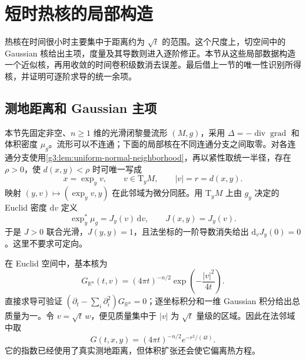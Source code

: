 
% 
% 

\section{短时热核的局部构造}
\label{g3:sec:1602}

热核在时间很小时主要集中于距离约为 \(\sqrt t\) 的范围。这个尺度上，切空间中的 Gaussian 核给出主项，度量及其导数则进入逐阶修正。本节从这些局部数据构造一个近似核，再用收敛的时间卷积级数消去误差。最后借上一节的唯一性识别所得核，并证明可逐阶求导的统一余项。

\subsection{测地距离和 Gaussian 主项}
\label{g3:subsec:1602:01}
本节先固定非空、\(n\ge1\) 维的光滑闭黎曼流形 \((M,g)\)，采用 \(\Delta=-\operatorname{div}\operatorname{grad}\) 和体积密度 \(\mu_g\)。流形可以不连通；下面的局部核在不同连通分支之间取零。对各连通分支使用\cref{g3:lem:uniform-normal-neighborhood}，再以紧性取统一半径，存在 \(\rho>0\)，使 \(d(x,y)<\rho\) 时可唯一写成
\[
	x=\exp_yv,\qquad v\in\mathrm T_yM,\qquad |v|=r=d(x,y).
\]
映射 \((y,v)\mapsto(\exp_yv,y)\) 在此邻域为微分同胚。用 \(\mathrm T_yM\) 上由 \(g_y\) 决定的 Euclid 密度 \(\mathrm dv\) 定义
\begin{equation}\label{g3:eq:heat-normal-density}
	\exp_y^*\mu_g=J_y(v)\,\mathrm dv,
	\qquad J(x,y)=J_y(v).
\end{equation}
于是 \(J>0\) 联合光滑，\(J(y,y)=1\)，且法坐标的一阶导数消失给出 \(\mathrm d_vJ_y(0)=0\)。这里不要求可定向。

\ProseParagraphBreak

在 Euclid 空间中，基本核为
\[
	G_{\mathbb R^n}(t,v)=(4\pi t)^{-n/2}
	\exp\!\left(-\frac{|v|^2}{4t}\right).
\]
直接求导可验证 \((\partial_t-\sum_i\partial_i^2)G_{\mathbb R^n}=0\)；逐坐标积分和一维 Gaussian 积分给出总质量为一。令 \(v=\sqrt t\,w\)，便见质量集中于 \(|v|\) 为 \(\sqrt t\) 量级的区域。因此在法邻域中取
\begin{equation}\label{g3:eq:heat-geodesic-gaussian}
	G(t,x,y)=(4\pi t)^{-n/2}e^{-r^2/(4t)}.
\end{equation}
它的指数已经使用了真实测地距离，但体积扩张还会使它偏离热方程。

